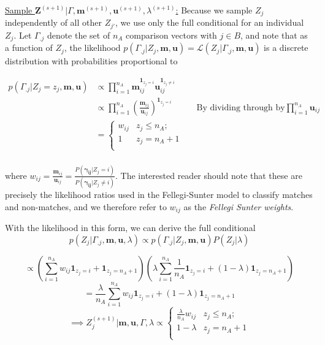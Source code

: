 \documentclass[
  12pt,
]{article}
\begin{document}
\underline{Sample $\mathbf{Z}^{(s+1)}|\Gamma, \mathbf{m}^{(s+1)}, \mathbf{u}^{(s+1)}, \lambda^{(s+1)}$:}
Because we sample \(Z_j\) independently of all other \(Z_{j'}\), we use
only the full conditional for an individual \(Z_j\). Let \(\Gamma_{.j}\)
denote the set of \(n_A\) comparison vectors with \(j \in B\), and note
that as a function of \(Z_j\), the likelihood
\(p(\Gamma_{.j}|Z_j, \mathbf{m}, \mathbf{u}) = \mathcal{L}(Z_j|\Gamma_{.j}, \mathbf{m}, \mathbf{u})\)
is a discrete distribution with probabilities proportional to

\begin{align*}
p(\Gamma_{.j}|Z_j = z_j, \mathbf{m}, \mathbf{u}) &\propto \prod_{i=1}^{n_A}\mathbf{m}_{ij}^{\mathbf{1}_{z_j = i}}\mathbf{u}_{ij}^{\mathbf{1}_{z_j \neq i}}\\
&\propto \prod_{i=1}^{n_A}\left(\frac{\mathbf{m}_{ij}}{\mathbf{u}_{ij}}\right)^{\mathbf{1}_{z_j = i}} && \text{By dividing through by} \prod_{i = 1}^{n_A}\mathbf{u}_{ij}\\
&=
\begin{cases} 
    w_{ij}  & z_j \leq n_A; \\
    1 &  z_j  = n_A + 1 \\
\end{cases}\\
\end{align*}

where
\(w_{ij} = \frac{\mathbf{m}_{ij}}{\mathbf{u}_{ij}} = \frac{P(\boldsymbol{\gamma_{ij}}|Z_j = i)}{P(\boldsymbol{\gamma_{ij}} |Z_j \neq i)}\).
The interested reader should note that these are precisely the
likelihood ratios used in the Fellegi-Sunter model to classify matches
and non-matches, and we therefore refer to \(w_{ij}\) as the
\emph{Fellegi Sunter weights}.

With the likelihood in this form, we can derive the full conditional
\[p(Z_j|\Gamma_{.j}, \mathbf{m} ,\mathbf{u}, \lambda) \propto p(\Gamma_{.j}| Z_j, \mathbf{m} ,\mathbf{u}) P(Z_j|\lambda)\]

\[\propto \left(\sum_{i=1}^{n_A}w_{ij}\mathbf{1}_{z_j = i} + \mathbf{1}_{z_j = n_A + 1}\right)\left(\lambda\sum_{i=1}^{n_A}\frac{1}{n_A}\mathbf{1}_{z_j = i} + (1-\lambda)\mathbf{1}_{z_j = n_A + 1}\right)\]
\[= \frac{\lambda}{n_A}\sum_{i=1}^{n_A}w_{ij}\mathbf{1}_{z_j = i} + (1-\lambda)\mathbf{1}_{z_j = n_A + 1} \]
\[ \implies Z_j^{(s+1)} | \mathbf{m}, \mathbf{u}, \Gamma, \lambda \propto
\begin{cases} 
    \frac{\lambda}{n_A}w_{ij}   & z_j \leq n_A; \\
     1-\lambda &  z_j  = n_A + 1 \\
\end{cases}\]
\end{document}
